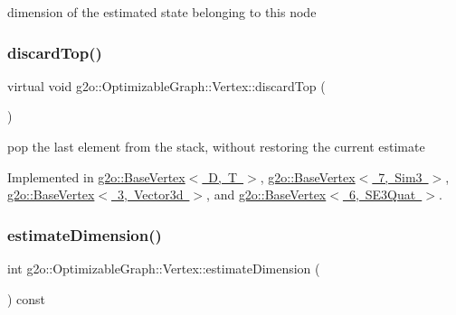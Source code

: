 dimension of the estimated state belonging to this node 

\mbox{\label{classg2o_1_1_optimizable_graph_1_1_vertex_a9509fb5c333988911312fc3d9187a9c3}} 
\subsubsection{\texorpdfstring{discard\+Top()}{discardTop()}}
{\footnotesize\ttfamily virtual void g2o\+::\+Optimizable\+Graph\+::\+Vertex\+::discard\+Top (\begin{DoxyParamCaption}{ }\end{DoxyParamCaption})\hspace{0.3cm}{\ttfamily [pure virtual]}}



pop the last element from the stack, without restoring the current estimate 



Implemented in \mbox{\hyperlink{classg2o_1_1_base_vertex_a71729c4d91044bde9bfea4c859b0c02d}{g2o\+::\+Base\+Vertex$<$ D, T $>$}}, \mbox{\hyperlink{classg2o_1_1_base_vertex_a71729c4d91044bde9bfea4c859b0c02d}{g2o\+::\+Base\+Vertex$<$ 7, Sim3 $>$}}, \mbox{\hyperlink{classg2o_1_1_base_vertex_a71729c4d91044bde9bfea4c859b0c02d}{g2o\+::\+Base\+Vertex$<$ 3, Vector3d $>$}}, and \mbox{\hyperlink{classg2o_1_1_base_vertex_a71729c4d91044bde9bfea4c859b0c02d}{g2o\+::\+Base\+Vertex$<$ 6, S\+E3\+Quat $>$}}.

\mbox{\label{classg2o_1_1_optimizable_graph_1_1_vertex_ae9d94367931458af6ca3d5589801b1e6}} 
\subsubsection{\texorpdfstring{estimate\+Dimension()}{estimateDimension()}}
{\footnotesize\ttfamily int g2o\+::\+Optimizable\+Graph\+::\+Vertex\+::estimate\+Dimension (\begin{DoxyParamCaption}{ }\end{DoxyParamCaption}) const\hspace{0.3cm}{\ttfamily [virtual]}}

